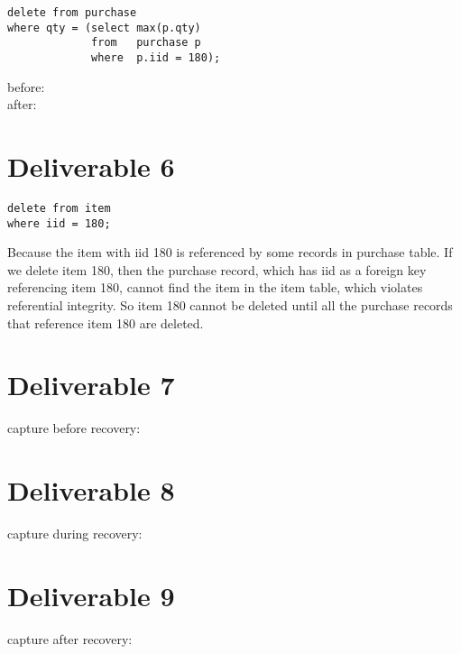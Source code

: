 \documentclass{article}
\begin{document}
\begin{verbatim}
delete from purchase
where qty = (select max(p.qty)
             from   purchase p
             where  p.iid = 180);
\end{verbatim}

\noindent before: \\


\noindent after: \\


\section{Deliverable 6}
\begin{verbatim}
delete from item
where iid = 180;
\end{verbatim}

Because the item with iid 180 is referenced by some records in purchase table. If we delete item 180, then the purchase record, which has iid as a foreign key referencing item 180, cannot find the item in the item table, which violates referential integrity. So item 180 cannot be deleted until all the purchase records that reference item 180 are deleted.

\section{Deliverable 7}

capture before recovery: \\


\section{Deliverable 8}

capture during recovery: \\


\section{Deliverable 9}

capture after recovery: \\
\end{document}
